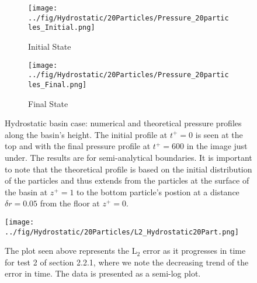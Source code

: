 \documentclass{../GPUSPHtemplate}
\begin{document}
\begin{figure}[H]
  \begin{subfigure}{.5\textwidth}
    \centering
    \texttt{[image: ../fig/Hydrostatic/20Particles/Pressure\_20particles\_Initial.png]}
    \vspace*{5pt}
    \caption{Initial State}
  \end{subfigure}%
  \begin{subfigure}{.5\textwidth}
    \centering 
    \texttt{[image: ../fig/Hydrostatic/20Particles/Pressure\_20particles\_Final.png]}
    \caption{Final State}        
  \end{subfigure}
  \caption{Hydrostatic basin case: numerical and theoretical pressure profiles along the basin's height.
    The initial profile at $t^+=0$ is seen at the top and with the final pressure profile at $t^+=600$ in the image just under.
    The results are for semi-analytical boundaries. It is important to note that the theoretical profile is
    based on the initial distribution of the particles and thus extends from the particles at the surface of the
    basin at $z^+=1$ to the bottom particle's postion at a distance $\delta r = 0.05 $ from the floor at $z^+=0$. }
  \label{fig:HydroExp2}
\end{figure}

\begin{figure}[H]
  \centering
  \texttt{[image: ../fig/Hydrostatic/20Particles/L2\_Hydrostatic20Part.png]}
  \caption{The plot seen above represents the L$_2$ error as it progresses in time for test 2 of section 2.2.1, where we note the decreasing trend of the error in time. The data is presented as a semi-log plot. }
  \label{fig:HydroExp2L2}
\end{figure}


\end{document}
